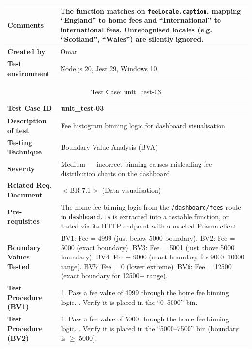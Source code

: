 \begin{table}[h!]
\begin{tabular}{|p{}|p{}|}
\textbf{Comments} & The function matches on \texttt{feeLocale.caption}, mapping ``England'' to home fees and ``International'' to international fees. Unrecognised locales (e.g. ``Scotland'', ``Wales'') are silently ignored. \\ \hline
\textbf{Created by} & Omar \\ \hline
\textbf{Test environment} & Node.js 20, Jest 29, Windows 10 \\ \hline
\end{tabular}
\end{table}

\begin{table}[h!]
\centering
\caption{Test Case: unit\_test-03}
\begin{tabular}{|p{}|p{}|}
\hline
\textbf{Test Case ID} & unit\_test-03 \\ \hline
\textbf{Description of test} & Fee histogram binning logic for dashboard visualisation \\ \hline
\textbf{Testing Technique} & Boundary Value Analysis (BVA) \\ \hline
\textbf{Severity} & Medium --- incorrect binning causes misleading fee distribution charts on the dashboard \\ \hline
\textbf{Related Req. Document} & $<$BR 7.1$>$ (Data visualisation) \\ \hline
\textbf{Pre-requisites} & The home fee binning logic from the \texttt{/dashboard/fees} route in \texttt{dashboard.ts} is extracted into a testable function, or tested via its HTTP endpoint with a mocked Prisma client. \\ \hline
\textbf{Boundary Values Tested} & BV1: Fee = 4999 (just below 5000 boundary). \newline BV2: Fee = 5000 (exact boundary). \newline BV3: Fee = 5001 (just above 5000 boundary). \newline BV4: Fee = 9000 (exact boundary for 9000--10000 range). \newline BV5: Fee = 0 (lower extreme). \newline BV6: Fee = 12500 (exact boundary for 12500+ range). \\ \hline
\textbf{Test Procedure (BV1)} & 1. Pass a fee value of 4999 through the home fee binning logic. \newline 2. Verify it is placed in the ``0--5000'' bin. \\ \hline
\textbf{Test Procedure (BV2)} & 1. Pass a fee value of 5000 through the home fee binning logic. \newline 2. Verify it is placed in the ``5000--7500'' bin (boundary is $\geq$ 5000). \\ \hline

\end{tabular}
\end{table}
